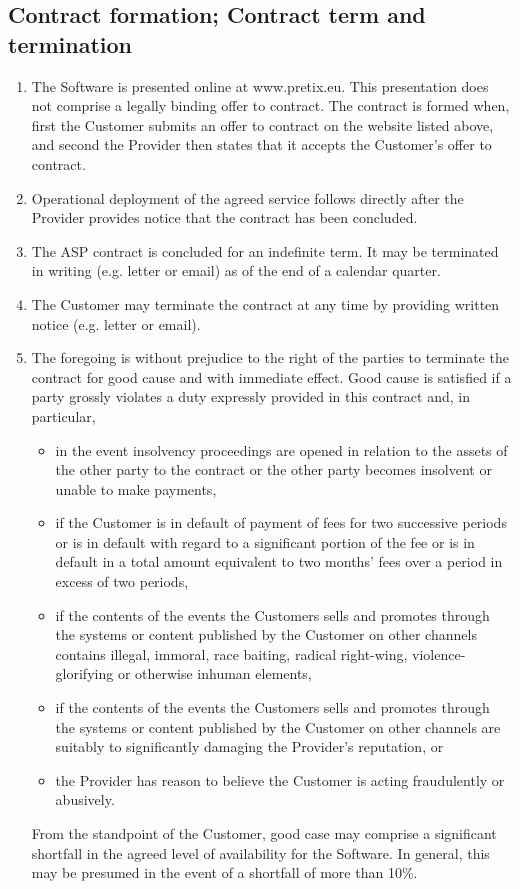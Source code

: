 \documentclass{terms}
\begin{document}
\subsection{Contract formation; Contract term and termination}
\begin{enumerate}
\item The Software is presented online at www.pretix.eu. This presentation does not comprise a legally binding offer to contract. The contract is formed when, first the Customer submits an offer to contract on the website listed above, and second the Provider then states that it accepts the Customer's offer to contract. 
\item Operational deployment of the agreed service follows directly after the Provider provides notice that the contract has been concluded.
\item The ASP contract is concluded for an indefinite term. It may be terminated in writing (e.g. letter or email) as of the end of a calendar quarter.
\item The Customer may terminate the contract at any time by providing written notice (e.g. letter or email).
\item The foregoing is without prejudice to the right of the parties to terminate the contract for good cause and with immediate effect. Good cause is satisfied if a party grossly violates a duty expressly provided in this contract and, in particular, \begin{itemize}
		\item in the event insolvency proceedings are opened in relation to the assets of the other party to the contract or the other party becomes insolvent or unable to make payments,
		\item if the Customer is in default of payment of fees for two successive periods or is in default with regard to a significant portion of the fee or is in default in a total amount equivalent to two months' fees over a period in excess of two periods,
		\item if the contents of the events the Customers sells and promotes through the systems or content published by the Customer on other channels contains illegal, immoral, race baiting, radical right-wing, violence-glorifying or otherwise inhuman elements,
		\item if the contents of the events the Customers sells and promotes through the systems or content published by the Customer on other channels are suitably to significantly damaging the Provider’s reputation, or
		\item the Provider has reason to believe the Customer is acting fraudulently or abusively.
	\end{itemize} From the standpoint of the Customer, good case may comprise a significant shortfall in the agreed level of availability for the Software. In general, this may be presumed in the event of a shortfall of more than 10\%.
\end{enumerate}
\end{document}
